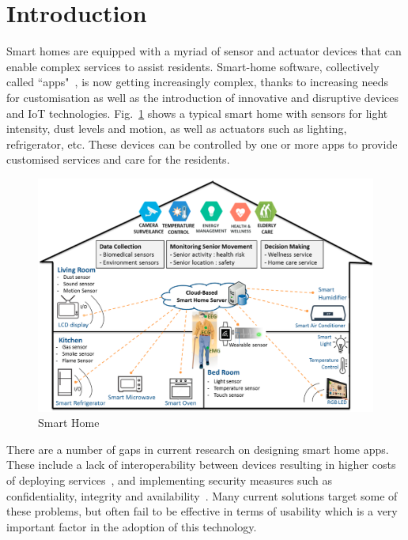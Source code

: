 \section{Introduction}

Smart homes are equipped with a myriad of sensor and actuator devices that can enable complex services to assist residents. Smart-home software, collectively called ``apps"~\cite{ALAA201748}, is now getting increasingly complex, thanks to increasing needs for customisation as well as the introduction of innovative and disruptive devices and IoT technologies.  Fig.~\ref{figure:SmartHome}  shows a typical smart home with sensors for light intensity, dust levels and motion, as well as actuators such as lighting, refrigerator, etc. These devices can be controlled by one or more apps to provide customised services and care for the residents. 

\begin{figure}[!h]
    \includegraphics[width=\textwidth]{figs/smarthome}
    \caption{Smart Home \cite{jung2017hybrid}}
    \label{figure:SmartHome}
\end{figure}



There are a number of gaps in current research on designing smart home apps. 
These include a lack of interoperability between devices resulting in higher costs of deploying services~\cite{stojkoska2017review}, and implementing security measures such as confidentiality, integrity and availability~\cite{schneps2012wired}. Many current solutions target some of these problems, but often  fail to be effective in terms of usability which is a very important factor in the adoption of this technology. 

